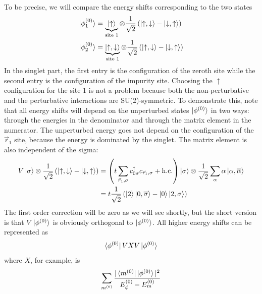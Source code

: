 \documentclass[12pt,twoside]{report}
\numberwithin{equation}{section}
\begin{document}
\pb To be precise, we will compare the energy shifts corresponding to the two states
\begin{equation}\begin{aligned}
	\ket{\phi^{(0)}_1} &= \underbrace{\ket{\uparrow}}_\text{site 1}\otimes\frac{1}{\sqrt 2}\left(\ket{\uparrow, \downarrow} - \ket{\downarrow, \uparrow} \right) \\
	\ket{\phi^{(0)}_2} &= \underbrace{\ket{\uparrow, \downarrow}}_\text{site 1}\otimes\frac{1}{\sqrt 2}\left(\ket{\uparrow, \downarrow} - \ket{\downarrow, \uparrow} \right) 
\end{aligned}\end{equation}
In the singlet part, the first entry is the configuration of the zeroth site while the second entry is the configuration of the impurity site. Choosing the \(\uparrow\) configuration for the site 1 is not a problem because both the non-perturbative and the perturbative interactions are SU(2)-symmetric. To demonstrate this, note that all energy shifts will depend on the unperturbed states \(\ket{\phi^{(0)}}\) in two ways: through the energies in the denominator and through the matrix element in the numerator. The unperturbed energy goes not depend on the configuration of the \(\vec r_1\) site, because the energy is dominated by the singlet. The matrix element is also independent of the sigma:
\begin{equation}\begin{aligned}
	V\ket{\sigma}\otimes\frac{1}{\sqrt 2}\left(\ket{\uparrow, \downarrow} - \ket{\downarrow, \uparrow} \right) &= \left(t\sum_{\vec r_1,\sigma} c^\dagger_{0\sigma}c_{\vec r_1,\sigma} +\text{h.c.}\right) \ket{\sigma}\otimes\frac{1}{\sqrt 2}\sum_\alpha\alpha\ket{\alpha, \overline\alpha}\\
														   &=t\frac{1}{\sqrt 2}\left(\ket{2}\ket{0,\overline\sigma} - \ket{0}\ket{2,\sigma}\right)
\end{aligned}\end{equation}
The first order correction will be zero as we will see shortly, but the short version is that \(V\ket{\phi^{(0)}}\) is obviously orthogonal to \(\ket{\phi^{(0)}}\). All higher energy shifts can be represented as
\begin{equation}\begin{aligned}
	\bra{\phi^{(0)}} V X V \ket{\phi^{(0)}}
\end{aligned}\end{equation}
where \(X\), for example, is 
\begin{equation}\begin{aligned}
	\sum_{m^{(0)}}\frac{|\bra{m^{(0)}}\ket{\phi^{(0)}}|^2}{E^{(0)}_\phi - E^{(0)}_m}
\end{aligned}\end{equation}
\end{document}
